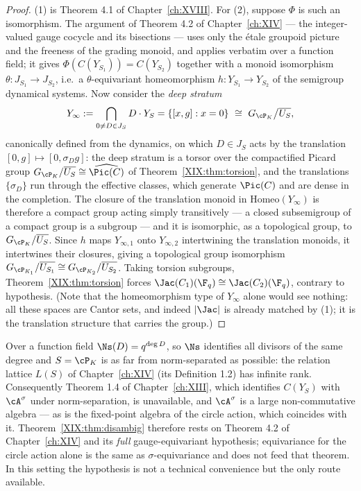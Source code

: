 \begin{proof}
(1) is Theorem 4.1 of Chapter~\ref{ch:XVIII}. For (2), suppose $\Phi$ is such an isomorphism. The
argument of Theorem 4.2 of Chapter~\ref{ch:XIV} --- the integer-valued gauge cocycle and its bisections
--- uses only the \'etale groupoid picture and the freeness of the grading monoid, and
applies verbatim over a function field; it gives $\Phi(C(Y_{S_1}))=C(Y_{S_2})$ together
with a monoid isomorphism $\theta:J_{S_1}\to J_{S_2}$, i.e.\ a $\theta$-equivariant
homeomorphism $h:Y_{S_1}\to Y_{S_2}$ of the semigroup dynamical systems. Now consider the
\emph{deep stratum}
\[
Y_\infty:=\bigcap_{0\ne D\in J_S}D\cdot Y_S=\{[x,g]:x=0\}\ \cong\ G_{\cP_K}\big/\overline{U_S},
\]
canonically defined from the dynamics, on which $D\in J_S$ acts by the translation
$[0,g]\mapsto[0,\sigma_Dg]$: the deep stratum is a torsor over the compactified Picard group
$G_{\cP_K}/\overline{U_S}\cong\widehat{\Pic(C)}$ of Theorem~\ref{XIX:thm:torsion}, and the
translations $\{\sigma_D\}$ run through the effective classes, which generate $\Pic(C)$ and
are dense in the completion. The closure of the translation monoid in
$\mathrm{Homeo}(Y_\infty)$ is therefore a compact group acting simply transitively --- a
closed subsemigroup of a compact group is a subgroup --- and it is isomorphic, as a
topological group, to $G_{\cP_K}/\overline{U_S}$. Since $h$ maps $Y_{\infty,1}$ onto
$Y_{\infty,2}$ intertwining the translation monoids, it intertwines their closures, giving
a topological group isomorphism
$G_{\cP_{K_1}}/\overline{U_{S_1}}\cong G_{\cP_{K_2}}/\overline{U_{S_2}}$. Taking torsion
subgroups, Theorem~\ref{XIX:thm:torsion} forces $\Jac(C_1)(\F_q)\cong\Jac(C_2)(\F_q)$, contrary
to hypothesis. (Note that the homeomorphism type of $Y_\infty$ alone would see nothing: all
these spaces are Cantor sets, and indeed $|\Jac|$ is already matched by (1); it is the
translation structure that carries the group.)
\end{proof}

\begin{remark}\label{XIX:rem:necessary}
Over a function field $\Ns(D)=q^{\deg D}$, so $\Ns$ identifies all divisors of the same
degree and $S=\cP_K$ is as far from norm-separated as possible: the relation lattice
$L(S)$ of Chapter~\ref{ch:XIV} (its Definition 1.2) has infinite rank. Consequently
Theorem 1.4 of Chapter~\ref{ch:XIII}, which identifies $C(Y_S)$ with $\cA^\sigma$ under
norm-separation, is unavailable, and
$\cA^\sigma$ is a large non-commutative algebra --- as is the fixed-point algebra of the
circle action, which coincides with it. Theorem~\ref{XIX:thm:disambig} therefore rests on
Theorem 4.2 of Chapter~\ref{ch:XIV} and its \emph{full} gauge-equivariant hypothesis; equivariance for
the circle action alone is the same as $\sigma$-equivariance and does not feed that theorem.
In this setting the hypothesis is not a
technical convenience but the only route available.
\end{remark}

